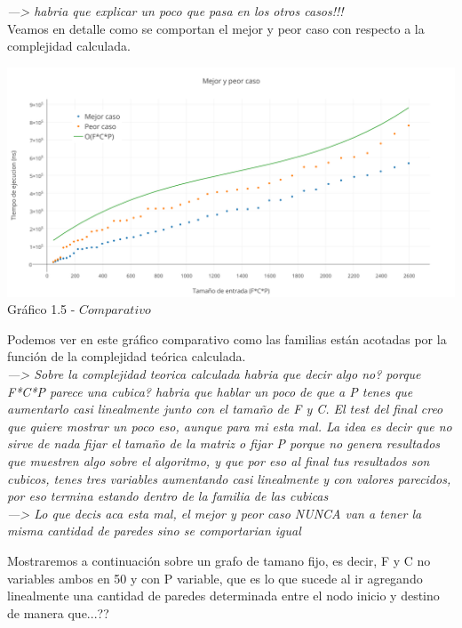 \textit{---> habria que explicar un poco que pasa en los otros casos!!!}\\

Veamos en detalle como se comportan el mejor y peor caso con respecto a la complejidad calculada.\\

  \vspace*{0.3cm} \vspace*{0.3cm}
  \begin{center}
\includegraphics[scale=0.5]{./EJ1/MejorYPeorCaso.png}
{Gr\'afico 1.5 - $Comparativo$}
  \end{center}
  \vspace*{0.3cm}
  
Podemos ver en este gr\'afico comparativo como las familias est\'an acotadas por la funci\'on de la complejidad te\'orica calculada.\\

\textit{---> Sobre la complejidad teorica calculada habria que decir algo no? porque F*C*P parece una cubica? habria que hablar un poco de que a P tenes que aumentarlo casi linealmente junto con el tamaño de F y C. El test del final creo que quiere mostrar un poco eso, aunque para mi esta mal. La idea es decir que no sirve de nada fijar el tamaño de la matriz o fijar P porque no genera resultados que muestren algo sobre el algoritmo, y que por eso al final tus resultados son cubicos, tenes tres variables aumentando casi linealmente y con valores parecidos, por eso termina estando dentro de la familia de las cubicas}\\
\textit{---> Lo que decis aca esta mal, el mejor y peor caso NUNCA van a tener la misma cantidad de paredes sino se comportarian igual}

Mostraremos a continuaci\'on sobre un grafo de tamano fijo, es decir, F y C no variables ambos en 50 y con P variable, que es lo que sucede al ir agregando linealmente una cantidad de paredes determinada entre el nodo inicio y destino de manera que...??\\

